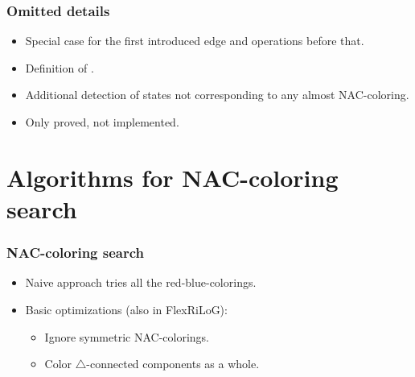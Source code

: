 \documentclass[aspectratio=\myaspectratio]{beamer}
\begin{document}
\begin{frame}
	\frametitle{Omitted details}

	\begin{itemize}
		\item
		      Special case for the first introduced edge and operations before that.
		\item
		      Definition of \IntroduceVertexWithEdgesNode{}.
		\item
		      Additional detection of states not corresponding to any almost NAC-coloring.
    \item
          Only proved, not implemented.
	\end{itemize}
\end{frame}

\section{Algorithms for NAC-coloring search}

\begin{frame}
	\frametitle{NAC-coloring search}
	\begin{itemize}
		\item
		      Naive approach tries all the red-blue-colorings.
		\item
		      Basic optimizations (also in FlexRiLoG):
		      \begin{itemize}
			      \item
			            Ignore symmetric NAC-colorings.
			      \item
			            Color \( \triangle \)-connected components as a whole.
		      \end{itemize}
	\end{itemize}
\end{frame}
\end{document}
